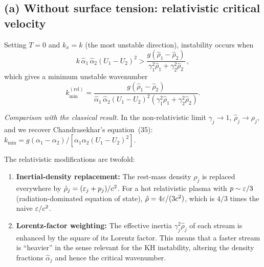 \subsection*{(a) Without surface tension: relativistic critical velocity}

Setting $T = 0$ and $k_x = k$ (the most unstable direction), instability
occurs when
\begin{equation}\label{eq:rel-11-22}
  k\,\hat{\alpha}_1\,\hat{\alpha}_2\!\left(U_1 - U_2\right)^{2}
  > \frac{g\!\left(\hat{\rho}_1 - \hat{\rho}_2\right)}
  {\gamma_1^{2}\hat{\rho}_1 + \gamma_2^{2}\hat{\rho}_2}\,,
\end{equation}
which gives a minimum unstable wavenumber
\begin{equation}\label{eq:rel-11-23}
  k_{\min}^{(\mathrm{rel})}
  = \frac{g\!\left(\hat{\rho}_1 - \hat{\rho}_2\right)}
  {\hat{\alpha}_1\,\hat{\alpha}_2\!\left(U_1 - U_2\right)^{2}
  \!\left(\gamma_1^{2}\hat{\rho}_1 + \gamma_2^{2}\hat{\rho}_2\right)}.
\end{equation}

\emph{Comparison with the classical result.}  In the non-relativistic
limit $\gamma_j \to 1$, $\hat{\rho}_j \to \rho_j$, and we recover
Chandrasekhar's equation~(35):
$k_{\min} = g(\alpha_1 - \alpha_2)/[\alpha_1\alpha_2(U_1 - U_2)^{2}]$.

The relativistic modifications are twofold:

\begin{enumerate}
\item \textbf{Inertial-density replacement:} The rest-mass density
$\rho_j$ is replaced everywhere by $\hat{\rho}_j = (\varepsilon_j + p_j)/c^{2}$.
For a hot relativistic plasma with $p \sim \varepsilon/3$ (radiation-dominated
equation of state), $\hat{\rho} = 4\varepsilon/(3c^{2})$, which is
$4/3$ times the naive $\varepsilon/c^{2}$.

\item \textbf{Lorentz-factor weighting:} The effective inertia
$\gamma_j^{2}\hat{\rho}_j$ of each stream is enhanced by the
square of its Lorentz factor.  This means that a faster stream is
``heavier'' in the sense relevant for the KH instability, altering the
density fractions $\hat{\alpha}_j$ and hence the critical wavenumber.
\end{enumerate}

